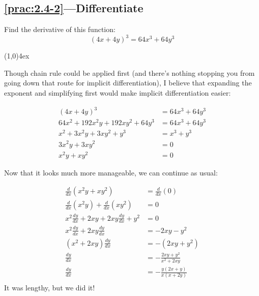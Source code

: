 \documentclass{MathNotes}
\newcommand{\br}{
\begin{center}
\line(1,0){4ex}
\end{center}}
\begin{document}
\newpage
\subsection*{\ref{prac:2.4-2}---Differentiate}\label{ans:2.4-2}
Find the derivative of this function: $$(4x+4y)^3=64x^3+64y^3$$
\br
Though chain rule could be applied first (and there's nothing stopping you from
going down that route for implicit differentiation), I believe that expanding
the exponent and simplifying first would make implicit differentiation easier:

\begin{align*}
    (4x+4y)^3&=64x^3+64y^3\\
    64x^2+192x^2y+192xy^2+64y^3&=64x^3+64y^3\\
    x^2+3x^2y+3xy^2+y^3&=x^3+y^3\\
    3x^2y+3xy^2&=0\\
    x^2y+xy^2&=0
\end{align*}

Now that it looks much more manageable, we can continue as usual:

\begin{align*}
    \frac{d}{dx}(x^2y+xy^2)&=\frac{d}{dx}(0)\\
    \frac{d}{dx}(x^2y)+\frac{d}{dx}(xy^2)&=0\\
    x^2\frac{dy}{dx}+2xy+2xy\frac{dy}{dx}+y^2&=0\\
    x^2\frac{dy}{dx}+2xy\frac{dy}{dx}&=-2xy-y^2\\
    (x^2+2xy)\frac{dy}{dx}&=-(2xy+y^2)\\
    \frac{dy}{dx}&=-\frac{2xy+y^2}{x^2+2xy}\\
    \frac{dy}{dx}&=-\frac{y(2x+y)}{x(x+2y)}\\
\end{align*}
It was lengthy, but we did it!

\end{document}
